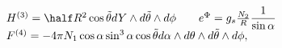 \begin{equation}
\begin{array}{l}
H^{(3)} = \half R^2 \cos \tilde{\theta} dY \wedge 
                                  d \tilde{\theta} \wedge d \phi 
\qquad
e^\Phi = g_s \frac{N_2}{R} \displaystyle{\frac{1}{\sin \alpha}}          \\
F^{(4)} = -4 \pi  N_1  \cos \alpha \sin^3 \alpha \cos \tilde{\theta} 
             d \alpha \wedge d \theta \wedge  d \tilde{\theta} \wedge d \phi,
\end{array}
\end{equation}

